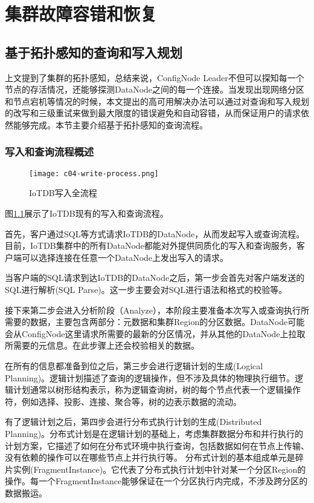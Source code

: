 
\chapter{集群故障容错和恢复}

\section{基于拓扑感知的查询和写入规划}
上文提到了集群的拓扑感知，总结来说，ConfigNode Leader不但可以探知每一个节点的存活情况，还能够探测DataNode之间的每一个连接。当发现出现网络分区和节点宕机等情况的时候，本文提出的高可用解决办法可以通过对查询和写入规划的改写和三级重试来做到最大限度的错误避免和自动容错，从而保证用户的请求依然能够完成。本节主要介绍基于拓扑感知的查询流程。

\subsection{写入和查询流程概述}

\begin{figure}
  \centering
  \texttt{[image: c04-write-process.png]}
  \caption{IoTDB写入全流程}
  \label{fig:c04-write-process}
\end{figure}

图\ref{fig:c04-write-process}展示了IoTDB现有的写入和查询流程。

首先，客户通过SQL等方式请求IoTDB的DataNode，从而发起写入或查询流程。目前，IoTDB集群中的所有DataNode都能对外提供同质化的写入和查询服务，客户端可以选择连接在任意一个DataNode上发出写入的请求。

当客户端的SQL请求到达IoTDB的DataNode之后，第一步会首先对客户端发送的SQL进行解析(SQL Parse)。这一步主要会对SQL进行语法和格式的校验等。

接下来第二步会进入分析阶段（Analyze），本阶段主要准备本次写入或查询执行所需要的数据，主要包含两部分：元数据和集群Region的分区数据。DataNode可能会从ConfigNode这里请求所需要的最新的分区情况，并从其他的DataNode上拉取所需要的元信息。在此步骤上还会校验相关的数据。

在所有的信息都准备到位之后，第三步会进行逻辑计划的生成(Logical Planning)。逻辑计划描述了查询的逻辑操作，但不涉及具体的物理执行细节。逻辑计划通常以树形结构表示，称为逻辑查询树，树的每个节点代表一个逻辑操作符，例如选择、投影、连接、聚合等，树的边表示数据的流动。

有了逻辑计划之后，第四步会进行分布式执行计划的生成(Distributed Planning)。分布式计划是在逻辑计划的基础上，考虑集群数据分布和并行执行的计划方案，它描述了如何在分布式环境中执行查询，包括数据如何在节点上传输、没有依赖的操作可以在哪些节点上并行执行等。
分布式计划的基本组成单元是碎片实例(FragmentInstance)。它代表了分布式执行计划中针对某一个分区Region的操作。每一个FragmentInstance能够保证在一个分区执行内完成，不涉及跨分区的数据搬运。

